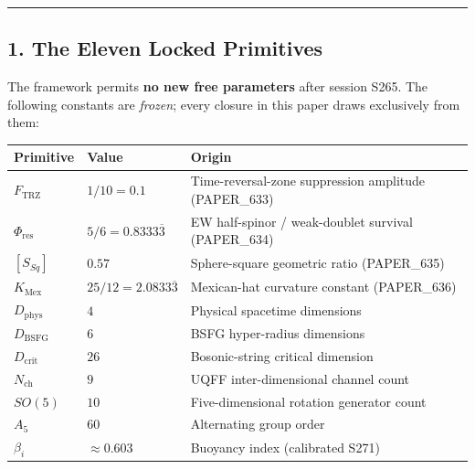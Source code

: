 \documentclass[
]{article}
\newcounter{none}
\begin{document}
\begin{center}\rule{0.5\linewidth}{0.5pt}\end{center}

\subsection{1. The Eleven Locked
Primitives}\label{the-eleven-locked-primitives}

The framework permits \textbf{no new free parameters} after session
S265. The following constants are \emph{frozen}; every closure in this
paper draws exclusively from them:

{\def\LTcaptype{none}
\begin{longtable}[]{@{}
  >{\raggedright\arraybackslash}p{}
  >{\raggedright\arraybackslash}p{}
  >{\raggedright\arraybackslash}p{}@{}}
\toprule\noalign{}
\begin{minipage}[b]{\linewidth}\raggedright
Primitive
\end{minipage} & \begin{minipage}[b]{\linewidth}\raggedright
Value
\end{minipage} & \begin{minipage}[b]{\linewidth}\raggedright
Origin
\end{minipage} \\
\midrule\noalign{}
\endhead
\bottomrule\noalign{}
\endlastfoot
\(F_{\text{TRZ}}\) & \(1/10 = 0.1\) & Time-reversal-zone suppression
amplitude (PAPER\_633) \\
\(\Phi_{\text{res}}\) & \(5/6 = 0.8333\overline{3}\) & EW half-spinor /
weak-doublet survival (PAPER\_634) \\
\([S_{Sq}]\) & \(0.57\) & Sphere-square geometric ratio (PAPER\_635) \\
\(K_{\text{Mex}}\) & \(25/12 = 2.0833\overline{3}\) & Mexican-hat
curvature constant (PAPER\_636) \\
\(D_{\text{phys}}\) & \(4\) & Physical spacetime dimensions \\
\(D_{\text{BSFG}}\) & \(6\) & BSFG hyper-radius dimensions \\
\(D_{\text{crit}}\) & \(26\) & Bosonic-string critical dimension \\
\(N_{\text{ch}}\) & \(9\) & UQFF inter-dimensional channel count \\
\(SO(5)\) & \(10\) & Five-dimensional rotation generator count \\
\(A_5\) & \(60\) & Alternating group order \\
\(\beta_i\) & \(\approx 0.603\) & Buoyancy index (calibrated S271) \\
\end{longtable}
}
\end{document}
